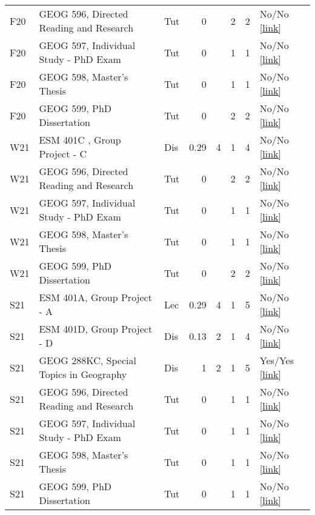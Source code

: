 \begin{longtable}{p{1cm}p{7cm}p{0.75cm}rrrrp{2.5cm}}
F20 & GEOG 596, Directed Reading and Research & Tut & 0 &  & 2 & 2 & No/No  \href{}{[link]}  \\ 
F20 & GEOG 597, Individual Study - PhD Exam & Tut & 0 &  & 1 & 1 & No/No  \href{}{[link]}  \\ 
F20 & GEOG 598, Master’s Thesis & Tut & 0 &  & 1 & 1 & No/No  \href{}{[link]}  \\ 
F20 & GEOG 599, PhD Dissertation & Tut & 0 &  & 2 & 2 & No/No  \href{}{[link]}  \\ 
W21 & ESM 401C , Group Project - C & Dis & 0.29 & 4 & 1 & 4 & No/No  \href{}{[link]}  \\ 
W21 & GEOG 596, Directed Reading and Research & Tut & 0 &  & 2 & 2 & No/No  \href{}{[link]}  \\ 
W21 & GEOG 597, Individual Study - PhD Exam & Tut & 0 &  & 1 & 1 & No/No  \href{}{[link]}  \\ 
W21 & GEOG 598, Master’s Thesis & Tut & 0 &  & 1 & 1 & No/No  \href{}{[link]}  \\ 
W21 & GEOG 599, PhD Dissertation & Tut & 0 &  & 2 & 2 & No/No  \href{}{[link]}  \\ 
S21 & ESM 401A, Group Project - A & Lec & 0.29 & 4 & 1 & 5 & No/No  \href{}{[link]}  \\ 
S21 & ESM 401D, Group Project - D & Dis & 0.13 & 2 & 1 & 4 & No/No  \href{}{[link]}  \\ 
S21 & GEOG 288KC, Special Topics in Geography & Dis & 1 & 2 & 1 & 5 & Yes/Yes  \href{https://ucsb.box.com/s/wkdexakrybpri16xk2gu5860so2ae0xa}{[link]}  \\ 
S21 & GEOG 596, Directed Reading and Research & Tut & 0 &  & 1 & 1 & No/No  \href{}{[link]}  \\ 
S21 & GEOG 597, Individual Study - PhD Exam & Tut & 0 &  & 1 & 1 & No/No  \href{}{[link]}  \\ 
S21 & GEOG 598, Master’s Thesis & Tut & 0 &  & 1 & 1 & No/No  \href{}{[link]}  \\ 
S21 & GEOG 599, PhD Dissertation & Tut & 0 &  & 1 & 1 & No/No  \href{}{[link]}  \\ 
 
\end{longtable}

